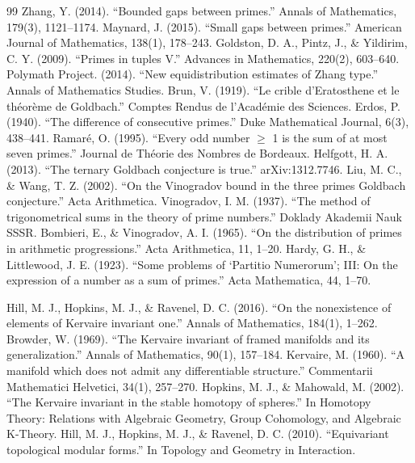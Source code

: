 \begin{thebibliography}{99}
 Zhang, Y. (2014). ``Bounded gaps between primes.'' Annals of Mathematics, 179(3), 1121--1174.
 Maynard, J. (2015). ``Small gaps between primes.'' American Journal of Mathematics, 138(1), 178--243.
 Goldston, D. A., Pintz, J., \& Yildirim, C. Y. (2009). ``Primes in tuples V.'' Advances in Mathematics, 220(2), 603--640.
 Polymath Project. (2014). ``New equidistribution estimates of Zhang type.'' Annals of Mathematics Studies.
 Brun, V. (1919). ``Le crible d'Eratosthene et le th\'eor\`eme de Goldbach.'' Comptes Rendus de l'Acad\'emie des Sciences.
 Erdos, P. (1940). ``The difference of consecutive primes.'' Duke Mathematical Journal, 6(3), 438--441.
 Ramar\'e, O. (1995). ``Every odd number $\geq$ 1 is the sum of at most seven primes.'' Journal de Th\'eorie des Nombres de Bordeaux.
 Helfgott, H. A. (2013). ``The ternary Goldbach conjecture is true.'' arXiv:1312.7746.
 Liu, M. C., \& Wang, T. Z. (2002). ``On the Vinogradov bound in the three primes Goldbach conjecture.'' Acta Arithmetica.
 Vinogradov, I. M. (1937). ``The method of trigonometrical sums in the theory of prime numbers.'' Doklady Akademii Nauk SSSR.
 Bombieri, E., \& Vinogradov, A. I. (1965). ``On the distribution of primes in arithmetic progressions.'' Acta Arithmetica, 11, 1--20.
 Hardy, G. H., \& Littlewood, J. E. (1923). ``Some problems of `Partitio Numerorum'; III: On the expression of a number as a sum of primes.'' Acta Mathematica, 44, 1--70.

 Hill, M. J., Hopkins, M. J., \& Ravenel, D. C. (2016). ``On the nonexistence of elements of Kervaire invariant one.'' Annals of Mathematics, 184(1), 1--262.
 Browder, W. (1969). ``The Kervaire invariant of framed manifolds and its generalization.'' Annals of Mathematics, 90(1), 157--184.
 Kervaire, M. (1960). ``A manifold which does not admit any differentiable structure.'' Commentarii Mathematici Helvetici, 34(1), 257--270.
 Hopkins, M. J., \& Mahowald, M. (2002). ``The Kervaire invariant in the stable homotopy of spheres.'' In Homotopy Theory: Relations with Algebraic Geometry, Group Cohomology, and Algebraic K-Theory.
 Hill, M. J., Hopkins, M. J., \& Ravenel, D. C. (2010). ``Equivariant topological modular forms.'' In Topology and Geometry in Interaction.


\end{thebibliography}
